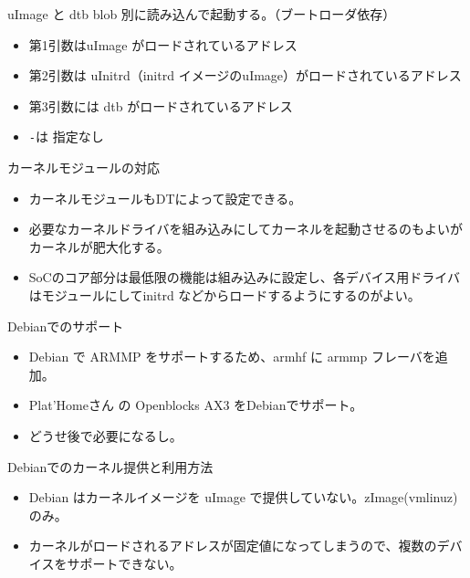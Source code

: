 \begin{frame}[containsverbatim]{uImage と dtb blob 別に読み込んで起動する。（ブートローダ依存）}


\begin{itemize}
\item 第1引数はuImage がロードされているアドレス
\item 第2引数は uInitrd（initrd イメージのuImage）がロードされているアドレス
\item 第3引数には dtb がロードされているアドレス
\item \texttt{-}は 指定なし
\end{itemize}

\end{frame}


\begin{frame}[containsverbatim]{カーネルモジュールの対応}

\begin{itemize}
\item カーネルモジュールもDTによって設定できる。
\item 必要なカーネルドライバを組み込みにしてカーネルを起動させるのもよいがカーネルが肥大化する。
\item SoCのコア部分は最低限の機能は組み込みに設定し、各デバイス用ドライバはモジュールにしてinitrd などからロードするようにするのがよい。
\end{itemize}

\end{frame}

\begin{frame}[containsverbatim]{Debianでのサポート}

\begin{itemize}
\item Debian で ARMMP をサポートするため、armhf に armmp フレーバを追加。
\item Plat'Homeさん の Openblocks AX3 をDebianでサポート。
\item どうせ後で必要になるし。
\end{itemize}

\end{frame}

\begin{frame}[containsverbatim]{Debianでのカーネル提供と利用方法}

\begin{itemize}
\item Debian はカーネルイメージを uImage で提供していない。zImage(vmlinuz)のみ。
\item カーネルがロードされるアドレスが固定値になってしまうので、複数のデバイスをサポートできない。
\end{itemize}

\end{frame}


